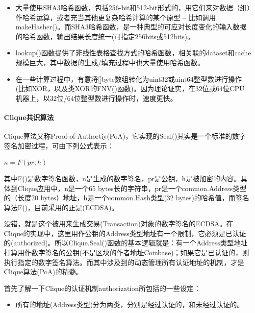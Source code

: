 \documentclass[UTF8]{ctexart}
\begin{document}
{\begin{itemize}

\item 大量使用SHA3哈希函数，包括256-bit和512-bit形式的，用它们来对数据（组）作哈希运算，或者充当其他更复杂哈希计算的某个原型 -- 比如调用makeHasher()。而SHA3哈希函数，是一种典型的可应对长度变化的输入数据的哈希函数，输出结果长度统一(可指定256bits或512bits)。

\item lookup()函数提供了非线性表格查找方式的哈希函数，相关联的dataset{}和cache{}规模巨大，其中数据的生成/填充过程中也大量使用哈希函数。

\item 在一些计算过程中，有意将[]byte数组转化为uint32或uint64整型数进行操作(比如XOR，以及类XOR的FNV()函数)。因为理论证实，在32位或64位CPU机器上，以32位/64位整型数进行操作时，速度更快。
\end{itemize}

\paragraph{Clique共识算法}
Clique算法又称Proof-of-Authortiy(PoA)，它实现的Seal()其实是一个标准的数字签名加密过程，可由下列公式表示：

\begin{center}
$n = F(pr, h)$
\end{center}

其中F()是数字签名函数，n是生成的数字签名，pr是公钥，h是被加密的内容。具体到Clique应用中，n是一个65 bytes长的字符串，pr是一个common.Address类型的（长度20 bytes）地址，h是一个common.Hash类型(32 bytes)的哈希值，而签名算法F()，目前采用的正是(ECDSA)。

没错，就是这个被用来生成交易(Transaction)对象的数字签名的ECDSA。在Clique的实现中，这里用作公钥的Address类型地址有一个限制，它必须是已认证的(authorized)。所以Clique.Seal()函数的基本逻辑就是：有一个Address类型地址打算用作数字签名的公钥(不是区块的作者地址Coinbase)；如果它是已认证的，则执行指定的数字签名算法。而其中涉及到的动态管理所有认证地址的机制，才是Clique算法(PoA)的精髓。


首先了解一下Clique的认证机制authorization所包括的一些设定：

\begin{itemize}

\item 所有的地址(Address类型)分为两类，分别是经过认证的，和未经过认证的。


\end{itemize}}
\end{document}

